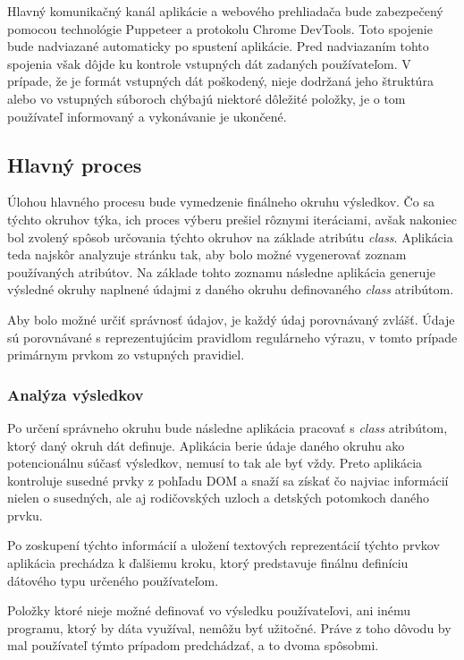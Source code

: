 Hlavný komunikačný kanál aplikácie a webového prehliadača bude zabezpečený pomocou technológie Puppeteer a protokolu Chrome DevTools. Toto spojenie bude nadviazané automaticky po spustení aplikácie. Pred nadviazaním tohto spojenia však dôjde ku kontrole vstupných dát zadaných používateľom. V prípade, že je formát vstupných dát poškodený, nieje dodržaná jeho štruktúra alebo vo vstupných súboroch chýbajú niektoré dôležité položky, je o tom používateľ informovaný a vykonávanie je ukončené.

\subsection{Hlavný proces}

Úlohou hlavného procesu bude vymedzenie finálneho okruhu výsledkov. Čo sa týchto okruhov týka, ich proces výberu prešiel rôznymi iteráciami, avšak nakoniec bol zvolený spôsob určovania týchto okruhov na základe atribútu \textit{class}. Aplikácia teda najskôr analyzuje stránku tak, aby bolo možné vygenerovať zoznam používaných atribútov. Na základe tohto zoznamu následne aplikácia generuje výsledné okruhy naplnené údajmi z daného okruhu definovaného \textit{class} atribútom. 

Aby bolo možné určiť správnosť údajov, je každý údaj porovnávaný zvlášť. Údaje sú porovnávané s reprezentujúcim pravidlom regulárneho výrazu, v tomto prípade primárnym prvkom zo vstupných pravidiel.


\subsubsection{Analýza výsledkov}

Po určení správneho okruhu bude následne aplikácia pracovať s \textit{class} atribútom, ktorý daný okruh dát definuje. Aplikácia berie údaje daného okruhu ako potencionálnu súčasť výsledkov, nemusí to tak ale byť  vždy. Preto aplikácia kontroluje susedné prvky z pohľadu DOM a snaží sa získať čo najviac informácií nielen o susedných, ale aj rodičovských uzloch a detských potomkoch daného prvku.

Po zoskupení týchto informácií a uložení textových reprezentácií týchto prvkov aplikácia prechádza k ďalšiemu kroku, ktorý predstavuje finálnu definíciu  dátového typu určeného používateľom.

\bigskip

Položky ktoré nieje možné definovať vo výsledku používateľovi, ani inému programu, ktorý by dáta využíval, nemôžu byť užitočné. Práve z toho dôvodu by mal používateľ týmto prípadom predchádzať, a to dvoma spôsobmi. 

